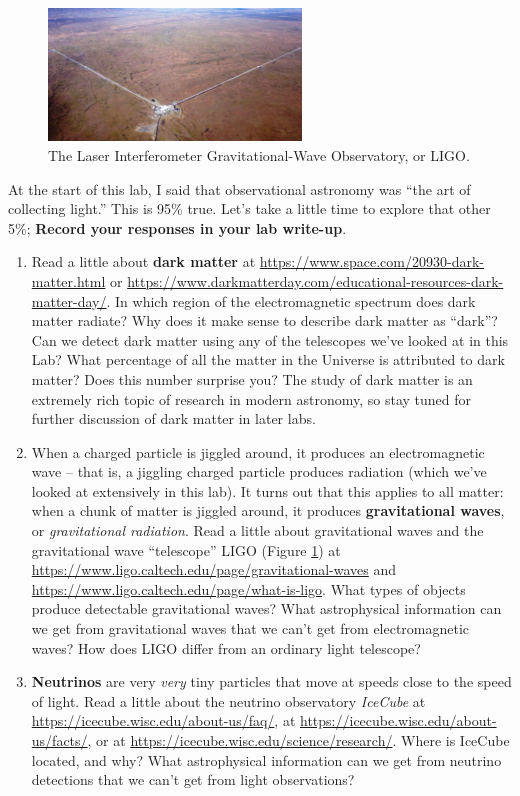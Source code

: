 \documentclass[11pt]{article}
\begin{document}
\begin{figure}
    \centering
    \includegraphics[width=0.6\textwidth]{Images/ligo.jpg}
    \caption{The Laser Interferometer Gravitational-Wave Observatory, or LIGO.}
    \label{fig:ligo}
\end{figure}

At the start of this lab, I said that observational astronomy was ``the art of collecting light.'' This is 95\% true. Let's take a little time to explore that other 5\%; \textbf{Record your responses in your lab write-up}. 
\begin{enumerate}
    \item Read a little about \textbf{dark matter} at \url{https://www.space.com/20930-dark-matter.html} or \url{https://www.darkmatterday.com/educational-resources-dark-matter-day/}. In which region of the electromagnetic spectrum does dark matter radiate? Why does it make sense to describe dark matter as ``dark''? Can we detect dark matter using any of the telescopes we've looked at in this Lab? What percentage of all the matter in the Universe is attributed to dark matter? Does this number surprise you? The study of dark matter is an extremely rich topic of research in modern astronomy, so stay tuned for further discussion of dark matter in later labs. 
    
    \item When a charged particle is jiggled around, it produces an electromagnetic wave -- that is, a jiggling charged particle produces radiation (which we've looked at extensively in this lab). It turns out that this applies to all matter: when a chunk of matter is jiggled around, it produces \textbf{gravitational waves}, or \emph{gravitational radiation}. Read a little about gravitational waves and the gravitational wave ``telescope'' LIGO (Figure \ref{fig:ligo}) at \url{https://www.ligo.caltech.edu/page/gravitational-waves} and \url{https://www.ligo.caltech.edu/page/what-is-ligo}. What types of objects produce detectable gravitational waves? What astrophysical information can we get from gravitational waves that we can't get from electromagnetic waves? How does LIGO differ from an ordinary light telescope?  
    
    \item \textbf{Neutrinos} are very \emph{very} tiny particles that move at speeds close to the speed of light. Read a little about the neutrino observatory \emph{IceCube} at \url{https://icecube.wisc.edu/about-us/faq/}, at \url{https://icecube.wisc.edu/about-us/facts/}, or at \url{https://icecube.wisc.edu/science/research/}. Where is IceCube located, and why? What astrophysical information can we get from neutrino detections that we can't get from light observations?
    
\end{enumerate}
\end{document}
